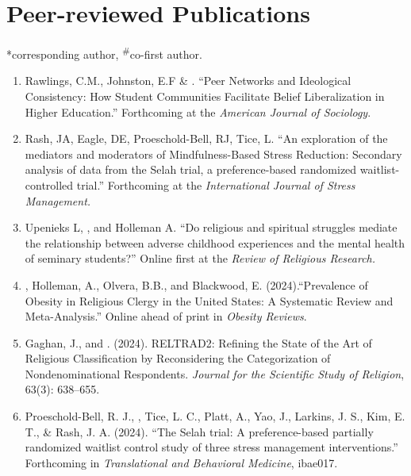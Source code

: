 \newcommand{\Revision}{\textit{under revision}}
\newcommand{\CS}{*} %
\newcommand{\CF}{\textsuperscript{\#}} %

\section*{Peer-reviewed Publications}
\CS corresponding author, \CF co-first author.

\begin{enumerate}
\item Rawlings, C.M., Johnston, E.F \& \Eagle. ``Peer Networks and Ideological Consistency: How Student Communities Facilitate Belief Liberalization in Higher Education.'' Forthcoming at the \textit{American Journal of Sociology}.

\item Rash, JA, Eagle, DE, Proeschold-Bell, RJ, Tice, L. ``An exploration of the mediators and moderators of Mindfulness-Based Stress Reduction: Secondary analysis of data from the Selah trial, a preference-based randomized waitlist-controlled trial.'' Forthcoming at the \textit{International Journal of Stress Management.}

\item Upenieks L, \Eagle, and Holleman A. ``Do religious and spiritual struggles mediate the relationship between adverse childhood experiences and the mental health of seminary students?'' Online first at the \textit{Review of Religious Research.} 

\item \Eagle, Holleman, A., Olvera, B.B., and Blackwood, E. (2024).``Prevalence of Obesity in Religious Clergy in the United States: A Systematic Review and Meta-Analysis.'' Online ahead of print in \textit{Obesity Reviews}. 

\item Gaghan, J., and \Eagle. (2024). RELTRAD2: Refining the State of the Art of Religious Classification by Reconsidering the Categorization of Nondenominational Respondents. \textit{Journal for the Scientific Study of Religion}, 63(3): 638--655. 

\item Proeschold-Bell, R. J., \Eagle, Tice, L. C., Platt, A., Yao, J., Larkins, J. S., Kim, E. T., \& Rash, J. A. (2024). ``The Selah trial: A preference-based partially randomized waitlist control study of three stress management interventions.''  Forthcoming in \textit{Translational and Behavioral Medicine}, ibae017. 


\end{enumerate}
